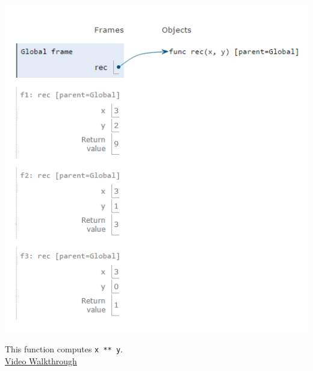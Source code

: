 \begin{blocksection}
\begin{solution}[0in]
\begin{center}
\includegraphics[scale=.8]{env-diagram-solution.png}
\end{center}
This function computes {\tt x ** y}. \\
\href{https://www.youtube.com/watch?v=n2Hq5EWuBGY&t=0s&list=PLx38hZJ5RLZd35oDi3TGz5p9DyyxU3WwA&index=3}{Video Walkthrough}
\end{solution}
\end{blocksection}
